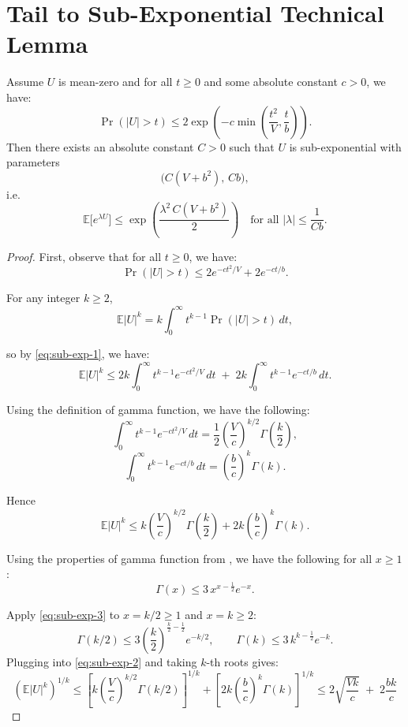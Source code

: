 \section{Tail to Sub-Exponential Technical Lemma}
\begin{lemma}\label{lem:tail-to-sub-exp}
    Assume $U$ is mean-zero and for all $t\ge 0$ and some absolute constant $c>0$, we have:
\[
\Pr(|U|>t)\le 2\exp\!\left(-c\min\!\left(\frac{t^2}{V},\frac{t}{b}\right)\right).
\]
Then there exists an absolute constant $C>0$ such that $U$ is sub-exponential with parameters
\[
\bigl(C(V+b^2),\, Cb\bigr),
\]
i.e.
\[
\mathbb E\bigl[e^{\lambda U}\bigr]\le \exp\!\left(\frac{\lambda^2\,C(V+b^2)}{2}\right)
\quad\text{for all }|\lambda|\le \frac{1}{Cb}.
\]
\end{lemma}
\begin{proof}
First, observe that for all $t\ge 0$, we have:
\begin{equation}\label{eq:sub-exp-1}
    \Pr(|U|>t)
\le 2e^{-c t^2/V}+2e^{-c t/b}.
\end{equation}


For any integer $k\ge 2$,
\[
\mathbb E|U|^k
= k\int_0^\infty t^{k-1}\Pr(|U|>t)\,dt,
\]

so by \eqref{eq:sub-exp-1}, we have:
\[
\mathbb E|U|^k
\le 2k\int_0^\infty t^{k-1}e^{-c t^2/V}\,dt
\;+\;2k\int_0^\infty t^{k-1}e^{-c t/b}\,dt.
\]

Using the definition of gamma function, we have the following:
\[
\int_0^\infty t^{k-1}e^{-c t^2/V}\,dt
=\frac12\left(\frac{V}{c}\right)^{k/2}\Gamma\!\left(\frac{k}{2}\right),
\]
\[
\int_0^\infty t^{k-1}e^{-c t/b}\,dt
=\left(\frac{b}{c}\right)^k\Gamma(k).
\]

Hence
\begin{equation}\label{eq:sub-exp-2}
    \mathbb E|U|^k
\le k\left(\frac{V}{c}\right)^{k/2}\Gamma\!\left(\frac{k}{2}\right)
+2k\left(\frac{b}{c}\right)^k\Gamma(k).
\end{equation}

Using the properties of gamma function from \cite{gubner2021gamma}, we have the following for all $x\geq 1$:
\begin{equation}\label{eq:sub-exp-3}
    \Gamma(x)\le 3\,x^{x-\frac12}e^{-x}.
\end{equation}

Apply \eqref{eq:sub-exp-3} to $x=k/2\ge 1$ and $x=k\ge 2$:
\[
\Gamma(k/2)\le 3\left(\frac{k}{2}\right)^{\frac{k}{2}-\frac12}e^{-k/2},
\qquad
\Gamma(k)\le 3\,k^{k-\frac12}e^{-k}.
\]
Plugging into \eqref{eq:sub-exp-2} and taking $k$-th roots gives:
\begin{equation}\label{eq:sub-exp-4}
    (\mathbb E|U|^k)^{1/k}
\le \left[k\left(\frac{V}{c}\right)^{k/2}\Gamma(k/2)\right]^{1/k}
+\left[2k\left(\frac{b}{c}\right)^k\Gamma(k)\right]^{1/k}\le 2\sqrt{\frac{Vk}{c}} \;+\; 2\frac{bk}{c}
\end{equation}


\end{proof}
